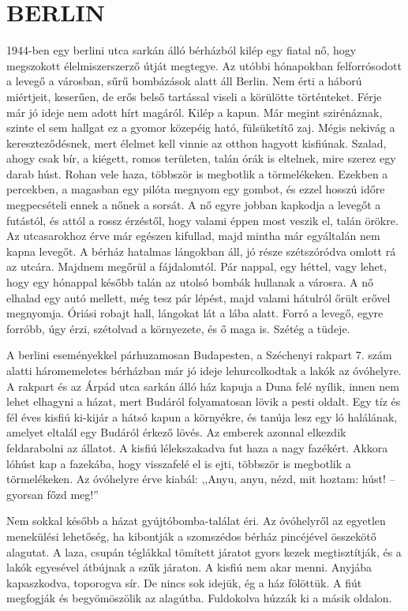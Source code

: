 \clearpage
\chapter{BERLIN}

1944-ben egy berlini utca sarkán álló bérházból kilép egy fiatal nő,
hogy megszokott élelmiszerszerző útját megtegye. Az utóbbi hónapokban
felforrósodott a levegő a városban, sűrű bombázások alatt áll
Berlin. Nem érti a háború miértjeit, keserűen, de erős belső tartással
viseli a körülötte történteket. Férje már jó ideje nem adott hírt magáról.
Kilép a kapun. Már megint szirénáznak, szinte el sem hallgat ez
a gyomor közepéig ható, fülsüketítő zaj. Mégis nekivág a kereszteződésnek,
mert élelmet kell vinnie az otthon hagyott kisfiúnak. Szalad,
ahogy csak bír, a kiégett, romos területen, talán órák is eltelnek, mire
szerez egy darab húst. Rohan vele haza, többször is megbotlik a
törmelékeken. Ezekben a percekben, a magasban egy pilóta megnyom egy
gombot, és ezzel hosszú időre megpecsételi ennek a nőnek a sorsát.
A nő egyre jobban kapkodja a levegőt a futástól, és attól a rossz érzéstől,
hogy valami éppen most veszik el, talán örökre. Az utcasarokhoz
érve már egészen kifullad, majd mintha már egyáltalán nem kapna levegőt.
A bérház hatalmas lángokban áll, jó része szétszóródva omlott
rá az utcára. Majdnem megőrül a fájdalomtól. Pár nappal, egy héttel,
vagy lehet, hogy egy hónappal később talán az utolsó bombák hullanak
a városra. A nő elhalad egy autó mellett, még tesz pár lépést, majd
valami hátulról őrült erővel megnyomja. Óriási robajt hall, lángokat
lát a lába alatt. Forró a levegő, egyre forróbb, úgy érzi, szétolvad a
környezete, és ő maga is. Szétég a tüdeje.

A berlini eseményekkel párhuzamosan Budapesten, a Széchenyi
rakpart 7. szám alatti háromemeletes bérházban már jó ideje lehurcolkodtak
a lakók az óvóhelyre. A rakpart és az Árpád utca sarkán
álló ház kapuja a Duna felé nyílik, innen nem lehet elhagyni a házat,
mert Budáról folyamatosan lövik a pesti oldalt. Egy tíz és fél éves kisfiú
ki-kijár a hátsó kapun a környékre, és tanúja lesz egy ló halálának,
amelyet eltalál egy Budáról érkező lövés. Az emberek azonnal elkezdik
feldarabolni az állatot. A kisfiú lélekszakadva fut haza a nagy fazékért.
Akkora lóhúst kap a fazekába, hogy visszafelé el is ejti, többször
is megbotlik a törmelékeken. Az óvóhelyre érve kiabál: ,,Anyu, anyu,
nézd, mit hoztam: húst! -- gyorsan főzd meg!''

Nem sokkal később a házat gyújtóbomba-találat éri. Az óvóhelyről
az egyetlen menekülési lehetőség, ha kibontják a szomszédos bérház
pincéjével összekötő alagutat. A laza, csupán téglákkal tömített járatot
gyors kezek megtisztítják, és a lakók egyesével átbújnak a szűk járaton.
A kisfiú nem akar menni. Anyjába kapaszkodva, toporogva sír. De
nincs sok idejük, ég a ház fölöttük. A fiút megfogják és begyömöszölik
az alagútba. Fuldokolva húzzák ki a másik oldalon.

